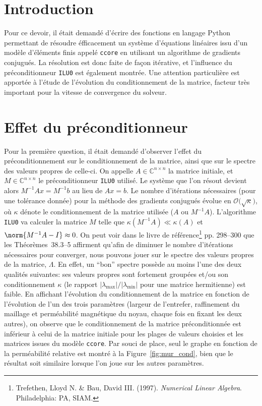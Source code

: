 \documentclass[11pt]{article}
\newcommand{\abs}[1]{\left\lvert#1\right\lvert}
\begin{document}
\section*{Introduction}
Pour ce devoir, il était demandé d'écrire des fonctions en langage Python permettant de résoudre éfficacement un système d'équations linéaires issu d'un modèle d'éléments finis appelé \lstinline[language=bash]{ccore} en utilisant un algorithme de gradients conjugués. La résolution est donc faite de façon itérative, et l'influence du préconditionneur \texttt{ILU0} est également montrée. Une attention particulière est apportée à l'étude de l'évolution du conditionnement de la matrice, facteur très important pour la vitesse de convergence du solveur.

\section{Effet du préconditionneur}
\label{sec:prec}
Pour la première question, il était demandé d'observer l'effet du préconditionnement sur le conditionnement de la matrice, ainsi que sur le spectre des valeurs propres de celle-ci.
On appelle $A \in \mathbb{C}^{n \times n}$ la matrice initiale, et $M \in \mathbb{C}^{n \times n}$ le préconditionneur \texttt{ILU0} utilisé.
Le système que l'on résout devient alors $M^{-1} A x = M^{-1}b$ au lieu de $Ax = b$.
Le nombre d'itérations nécessaires (pour une tolérance donnée) pour la méthode des gradients conjugués évolue en $\mathcal{O}\big(\sqrt{\kappa}\big)$, où $\kappa$ dénote le conditionnement de la matrice utilisée ($A$ ou $M^{-1}A$).
L'algorithme \texttt{ILU0} va calculer la matrice $M$ telle que $\kappa(M^{-1}A) \ll \kappa(A)$ et $\norm{M^{-1}A - I} \approx 0$.
On peut voir dans le livre de référence\footnote{Trefethen, Lloyd N. \& Bau, David \textrm{III}. (1997). \textit{Numerical Linear Algebra}. Philadelphia: \textsc{PA}, \textsc{SIAM}.} pp. 298--300 que les Théorèmes~38.3--5 affirment qu'afin de diminuer le nombre d'itérations nécessaires pour converger, nous pouvons jouer sur le spectre des valeurs propres de la matrice, $\Lambda$. En effet, un \foreignquote{french}{bon} spectre possède au moins l'une des deux qualités suivantes: ses valeurs propres sont fortement groupées et/ou son conditionnement $\kappa$ (le rapport $\abs{\lambda_{\max}} / \abs{\lambda_{\min}}$ pour une matrice hermitienne) est faible.
En affichant l'évolution du conditionnement de la matrice en fonction de l'évolution de l'un des trois paramètres (largeur de l'entrefer, raffinement du maillage et perméabilité magnétique du noyau, chaque fois en fixant les deux autres), on observe que le conditionnement de la matrice préconditionnée est inférieur à celui de la matrice initiale pour les plages de valeurs choisies et les matrices issues du modèle \texttt{ccore}. Par souci de place, seul le graphe en fonction de la perméabilité relative est montré à la Figure~\ref{fig:mur_cond}, bien que le résultat soit similaire lorsque l'on joue sur les autres paramètres.
\end{document}
